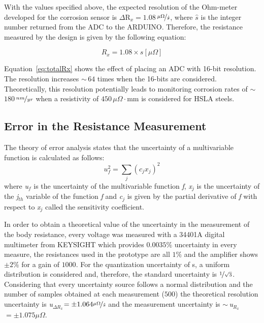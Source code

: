 \documentclass[journal,twoside,web]{ieeecolor}
\begin{document}
With the values specified above, the expected resolution of the Ohm-meter developed for the corrosion sensor is $\Delta$R$_{x}=1.08$\,$\nicefrac{\mu\Omega}{\hat{s}}$, where $\hat{s}$ is the integer number returned from the ADC to the ARDUINO. Therefore, the resistance measured by the design is given by the following equation:

\begin{equation}
\label{eq:totalRx}
R_{x} = 1.08 \times s \left[\mu\Omega\right]
\end{equation}

Equation~\ref{eq:totalRx} shows the effect of placing an ADC with 16-bit resolution. The resolution increases $\sim$\,$64$ times when the 16-bits are considered. Theoretically, this resolution potentially leads to monitoring corrosion rates of $\sim$\,$180$\,$\nicefrac{nm}{yr}$ when a resistivity of $450$\,$\mu\Omega\cdot$mm is considered for HSLA steels.

\subsection{Error in the Resistance Measurement}
\label{ssec:errorRmeas}

The theory of error analysis states that the uncertainty of a multivariable function is calculated as follows:
\begin{equation}
\label{eq:errorGen}
u_{f}^{2}=\sum_{j}\left(c_{j}x_{j}\right)^{2} 
\end{equation}
where \textit{u$_{f}$} is the uncertainty of the multivariable function \textit{f}, \textit{x$_{j}$} is the uncertainty of the \textit{j$_{th}$} variable of the function \textit{f} and \textit{c$_{j}$} is given by the partial derivative of \textit{f} with respect to \textit{x$_{j}$} called the sensitivity coefficient.

In order to obtain a theoretical value of the uncertainty in the measurement of the body resistance, every voltage was measured with a 34401A digital multimeter from KEYSIGHT which provides $0.0035\%$ uncertainty in every measure, the resistances used in the prototype are all $1\%$ and the amplifier shows $\pm2\%$ for a gain of $1000$. For the quantization uncertainty of s, a uniform distribution is considered and, therefore, the standard uncertainty is $\nicefrac{1}{\sqrt{3}}$. Considering that every uncertainty source follows a normal distribution and the number of samples obtained at each measurement ($500$) the theoretical resolution uncertainty is \textit{u$_{\Delta R_{x}}$}$=\pm1.064\nicefrac{\mu\Omega}{\hat{s}}$ and the measurement uncertainty is $\sim$\,\textit{u$_{R_{x}}$}$=\pm1.075\mu\Omega$.
\end{document}
